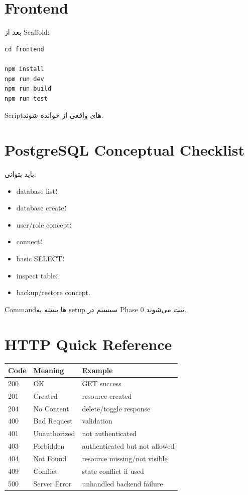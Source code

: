 \section{Frontend}

بعد از Scaffold:
\begin{latin}
\begin{lstlisting}
cd frontend

npm install
npm run dev
npm run build
npm run test
\end{lstlisting}
\end{latin}

Scriptهای واقعی از  خوانده شوند.

\section{PostgreSQL Conceptual Checklist}

باید بتوانی:
\begin{itemize}
  \item database list؛
  \item database create؛
  \item user/role concept؛
  \item connect؛
  \item basic SELECT؛
  \item inspect table؛
  \item backup/restore concept.
\end{itemize}

Commandها بسته به setup سیستم در Phase 0 ثبت می‌شوند.

\section{HTTP Quick Reference}

\begin{longtable}{p{2cm}p{4cm}p{6cm}}
\toprule
Code & Meaning & Example \\
\midrule
200 & OK & GET success \\
201 & Created & resource created \\
204 & No Content & delete/toggle response \\
400 & Bad Request & validation \\
401 & Unauthorized & not authenticated \\
403 & Forbidden & authenticated but not allowed \\
404 & Not Found & resource missing/not visible \\
409 & Conflict & state conflict if used \\
500 & Server Error & unhandled backend failure \\
\bottomrule
\end{longtable}

